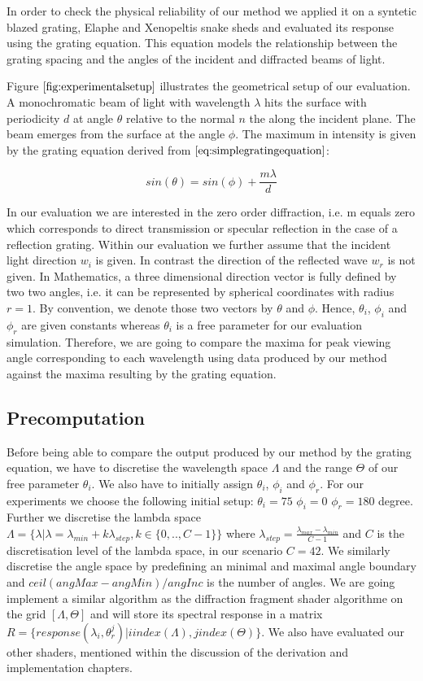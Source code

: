 In order to check the physical reliability of our method we applied it on a syntetic blazed grating, Elaphe and Xenopeltis snake sheds and evaluated its response using the grating equation. This equation models the relationship between the grating spacing and the angles of the incident and diffracted beams of light. 

Figure $\ref{fig:experimentalsetup}$ illustrates the geometrical setup of our evaluation. A monochromatic beam of light with wavelength $\lambda$ hits the surface with periodicity $d$ at angle $\theta$ relative to the normal $n$ the along the incident plane. The beam emerges from the surface at the angle $\phi$. The maximum in intensity is given by the grating equation derived from $\ref{eq:simplegratingequation}$: 

\begin{equation}
  sin(\theta) = sin(\phi) + \frac{m \lambda}{d}
\label{eq:gratingeq}
\end{equation}

In our evaluation we are interested in the zero order diffraction, i.e. m equals zero which corresponds to direct transmission or specular reflection in the case of a reflection grating. 
Within our evaluation we further assume that the incident light direction $w_i$ is given. In contrast the direction of the reflected wave $w_r$ is not given.
In Mathematics, a three dimensional direction vector is fully defined by two two angles, i.e. it can be represented by spherical coordinates with radius $r = 1$. By convention, we denote those two vectors by $\theta$ and $\phi$. Hence, $\theta_i$, $\phi_i$ and $\phi_r$ are given constants whereas $\theta_i$ is a free parameter for our evaluation simulation. Therefore, we are going to compare the maxima for peak viewing angle corresponding to each wavelength using data produced by our method against the maxima resulting by the grating equation.

\subsection{Precomputation}
Before being able to compare the output produced by our method by the grating equation, we have to discretise the wavelength space $\Lambda$ and the range $\Theta$ of our free parameter $\theta_i$. We also have to initially assign  $\theta_i$, $\phi_i$ and $\phi_r$. For our experiments we choose the following initial setup: $\theta_i = 75$ $\phi_i = 0$ $\phi_r = 180$ degree.
Further we discretise the lambda space $\Lambda = \{\lambda | \lambda = \lambda_{min} + k\lambda_{step}, k \in \{0,..,C-1\}\}$ where $\lambda_{step} = \frac{\lambda_{max}-\lambda_{min}}{C-1}$ and $C$ is the discretisation level of the lambda space, in our scenario $C = 42$. We similarly discretise the angle space by predefining an minimal and maximal angle boundary and $ceil(angMax - angMin) / angInc$ is the number of angles. 
We are going implement a similar algorithm as the diffraction fragment shader algorithme on the grid $[\Lambda, \Theta]$ and will store its spectral response in a matrix $R = \{response(\lambda_i, \theta_{r}^{j}) | i index(\Lambda), j index(\Theta)\}$. We also have evaluated our other shaders, mentioned within the discussion of the derivation and implementation chapters.

